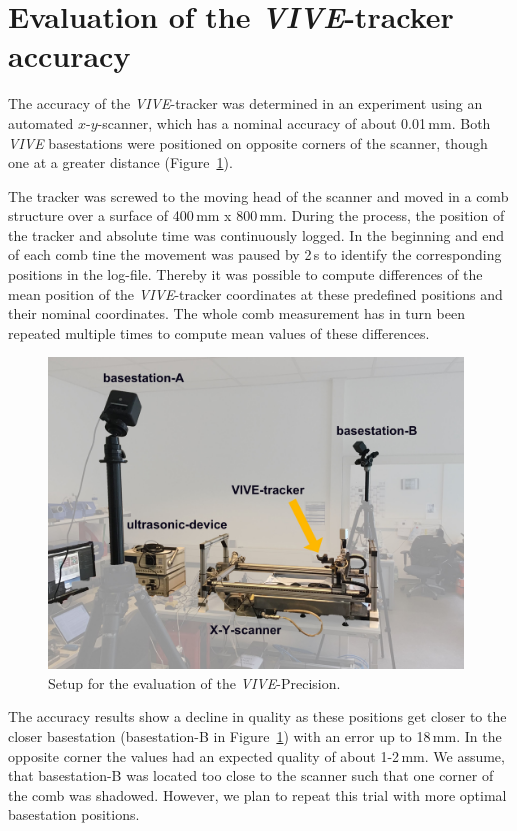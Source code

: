 \documentclass{VRARWorkshop}
\begin{document}
\section{Evaluation of the \textit{VIVE}-tracker accuracy}
The accuracy of the \textit{VIVE}-tracker was determined in an experiment using an automated $x$-$y$-scanner, which has a nominal accuracy of about 0.01\,mm.
Both \textit{VIVE} basestations were positioned on opposite corners of the scanner, though one at a greater distance (Figure~\ref{fig:precisionMeasurementSetup}).

The tracker was screwed to the moving head of the scanner and moved in a comb structure over a surface of 400\,mm x 800\,mm.
During the process, the position of the tracker and absolute time was continuously logged.
In the beginning and end of each comb tine the movement was paused by 2\,s to identify the corresponding positions in the log-file.
Thereby it was possible to compute differences of the mean position of the \textit{VIVE}-tracker coordinates at these predefined positions and their nominal coordinates.
The whole comb measurement has in turn been repeated multiple times to compute mean values of these differences.
\begin{figure}[h!]
    \begin{center}
        \includegraphics[width=110mm]{images/PrecisionMeasurement}
        \caption{\label{fig:precisionMeasurementSetup} Setup for the evaluation of the \textit{VIVE}-Precision.}
    \end{center}
\end{figure}
The accuracy results show a decline in quality as these positions get closer to the closer basestation (basestation-B in Figure~\ref{fig:precisionMeasurementSetup}) with an error up to 18\,mm.
In the opposite corner the values had an expected quality of about 1-2\,mm.
We assume, that basestation-B was located too close to the scanner such that one corner of the comb was shadowed.
However, we plan to repeat this trial with more optimal basestation positions.
\end{document}
